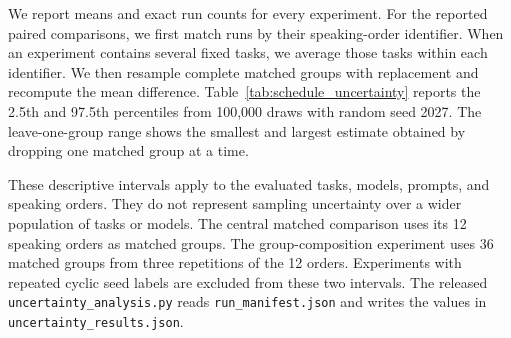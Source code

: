 We report means and exact run counts for every experiment. For the reported paired comparisons, we first match runs by their speaking-order identifier. When an experiment contains several fixed tasks, we average those tasks within each identifier. We then resample complete matched groups with replacement and recompute the mean difference. Table~\ref{tab:schedule_uncertainty} reports the 2.5th and 97.5th percentiles from 100,000 draws with random seed 2027. The leave-one-group range shows the smallest and largest estimate obtained by dropping one matched group at a time.

These descriptive intervals apply to the evaluated tasks, models, prompts, and speaking orders. They do not represent sampling uncertainty over a wider population of tasks or models. The central matched comparison uses its 12 speaking orders as matched groups. The group-composition experiment uses 36 matched groups from three repetitions of the 12 orders. Experiments with repeated cyclic seed labels are excluded from these two intervals. The released \texttt{uncertainty\_analysis.py} reads \texttt{run\_manifest.json} and writes the values in \texttt{uncertainty\_results.json}.

